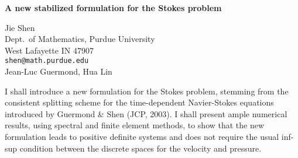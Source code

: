 \documentclass{report}
\begin{document}

\begin{center}
{\large
{\bf A new stabilized formulation for the Stokes problem}}

	Jie Shen \\
	Dept.~of Mathematics, Purdue University \\
	West Lafayette IN 47907 \\
	{\tt shen@math.purdue.edu} \\
	Jean-Luc Guermond, Hua Lin
\end{center}
I shall introduce a new formulation for the Stokes problem,
stemming from the consistent splitting scheme for the
time-dependent Navier-Stokes equations introduced by
Guermond \& Shen (JCP, 2003). I shall present ample numerical
results, using spectral and finite element methods, to show
that the new formulation leads to positive definite systems
and does not require the usual inf-sup condition between the
discrete spaces for the velocity and pressure.



\end{document}

